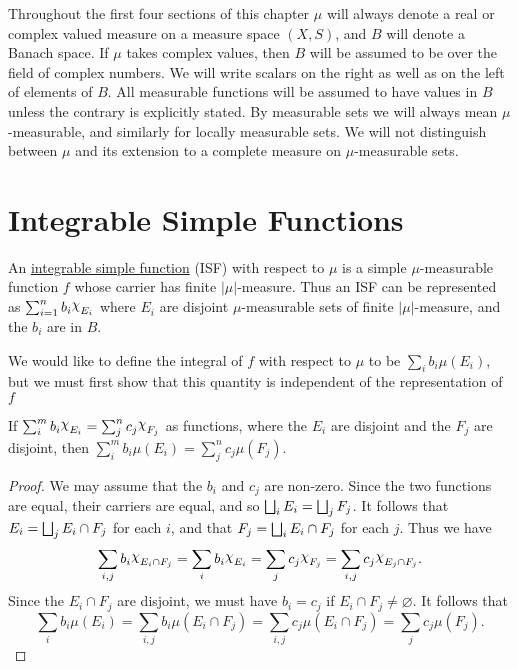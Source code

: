 

Throughout the first four sections of this chapter $\mu$ will always denote a real or complex valued measure on a measure space $(X,S)$, and $B$ will denote a Banach space. If $\mu$ takes complex values, then $B$ will be assumed to be over the field of complex numbers. We will write scalars on the right as well as on the left of elements of $B$. All measurable functions will be assumed to have values in $B$ unless the contrary is explicitly stated. By measurable sets we will always mean $\mu$-measurable, and similarly for locally measurable sets. We will not distinguish between $\mu$ and its extension to a complete measure on $\mu$-measurable sets.

\section{Integrable Simple Functions}

\begin{definition} 
An \underline{integrable simple function} (ISF) with respect to $\mu$ is a simple $\mu$-measurable function $f$ whose carrier has finite $|\mu|$-measure. Thus an ISF can be represented as $\sum_{i=1}^nb_i\idf{E_i}$ where $E_i$ are disjoint $\mu$-measurable sets of finite $|\mu|$-measure, and the $b_i$ are in $B$.
\end{definition}

We would like to define the integral of $f$ with respect to $\mu$ to be $\sum_ib_i\mu(E_i)$, but we must first show that this quantity is independent of the representation of $f$

\begin{lemma}
If $\sum_i^mb_i\idf{E_i}=\sum_j^nc_j\idf{F_j}$ as functions, where the $E_i$ are disjoint and the $F_j$ are disjoint, then $\sum_i^mb_i\mu(E_i)=\sum_j^nc_j\mu(F_j)$.
\end{lemma}

\begin{proof}
We may assume that the $b_i$ and $c_j$ are non-zero. Since the two functions are equal, their carriers are equal, and so $\bigsqcup_i E_i=\bigsqcup_j F_j$. It follows that $E_i=\bigsqcup_j E_i \cap F_j$ for each $i$, and that $F_j=\bigsqcup_iE_i \cap F_j$ for each $j$. Thus we have $$\sum_{i, j}b_i\idf{E_i \cap F_j}=\sum_i b_i\idf{E_i}=\sum_jc_j\idf{F_j}=\sum_{i, j} c_j\idf{E_j\cap F_j}.$$ Since the $E_i \cap F_j$ are disjoint, we must have $b_i=c_j$ if $E_i \cap F_j \neq \varnothing$. It follows that $$\sum_ib_i\mu(E_i)=\sum_{i,j}b_i\mu(E_i\cap F_j)=\sum_{i,j}c_j\mu(E_i\cap F_j)=\sum_jc_j\mu(F_j).$$
\end{proof}


